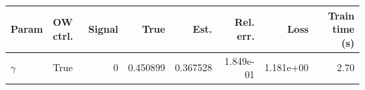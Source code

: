 \begin{tabular}{llrrrrrr}
\hline
Param & OW ctrl. & Signal & True & Est. & Rel. err. & Loss & Train time (s) \\
\hline
$\gamma$ & True & 0 & 0.450899 & 0.367528 & 1.849e-01 & 1.181e+00 & 2.70 \\
\hline
\end{tabular}
